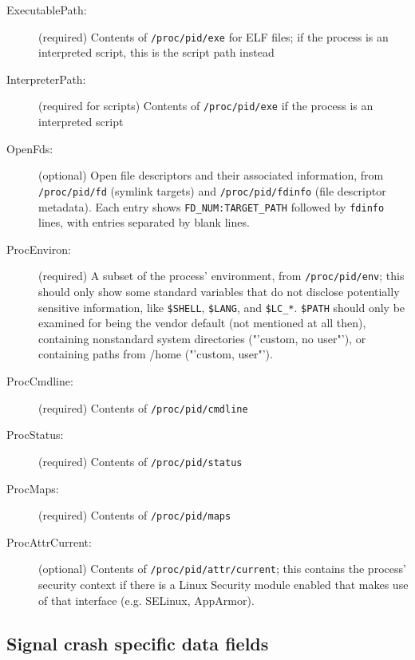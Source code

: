 \documentclass[DIV12,halfparskip]{scrartcl}
\begin{document}
\begin{description}
    \item [ExecutablePath:] (required) Contents of \verb!/proc/pid/exe! for ELF
    files; if the process is an interpreted script, this is the script path instead

    \item [InterpreterPath:] (required for scripts) Contents of
    \verb!/proc/pid/exe! if the process is an interpreted script

    \item [OpenFds:] (optional) Open file descriptors and their associated
    information, from \verb!/proc/pid/fd! (symlink targets) and
    \verb!/proc/pid/fdinfo! (file descriptor metadata). Each entry shows
    \verb!FD_NUM:TARGET_PATH! followed by \verb!fdinfo! lines, with entries
    separated by blank lines.

    \item [ProcEnviron:] (required) A subset of the process' environment, from
    \verb!/proc/pid/env!; this should only show some standard variables that do
    not disclose potentially sensitive information, like \verb!$SHELL!,
    \verb!$LANG!, and \verb!$LC_*!. \verb!$PATH! should only be examined for
    being the vendor default (not mentioned at all then), containing
    nonstandard system directories ("'custom, no user"'), or containing paths
    from /home ("'custom, user"').

    \item [ProcCmdline:] (required) Contents of \verb!/proc/pid/cmdline!

    \item [ProcStatus:] (required) Contents of \verb!/proc/pid/status!

    \item [ProcMaps:] (required) Contents of \verb!/proc/pid/maps!

    \item [ProcAttrCurrent:] (optional) Contents of
    \verb!/proc/pid/attr/current!; this contains the process' security
    context if there is a Linux Security module enabled that makes use
    of that interface (e.g. SELinux, AppArmor).

\end{description}

\subsection{Signal crash specific data fields}
\end{document}

